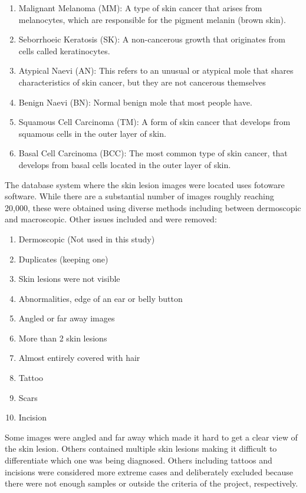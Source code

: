 \begin{enumerate}
    \item Malignant Melanoma (MM): A type of skin cancer that arises from melanocytes, which are responsible for the pigment melanin (brown skin).
    \item Seborrhoeic Keratosis (SK): A non-cancerous growth that originates from cells called keratinocytes.
    \item Atypical Naevi (AN): This refers to an unusual or atypical mole that shares characteristics of skin cancer, but they are not cancerous themselves
    \item Benign Naevi (BN): Normal benign mole that most people have.
    \item Squamous Cell Carcinoma (TM): A form of skin cancer that develops from squamous cells in the outer layer of skin.
    \item Basal Cell Carcinoma (BCC): The most common type of skin cancer, that develops from basal cells located in the outer layer of skin.
\end{enumerate}

The database system where the skin lesion images were located uses fotoware software. While there are a substantial number of images roughly reaching 20,000, these were obtained using diverse methods including between dermoscopic and macroscopic. Other issues included and were removed: 

\begin{enumerate}
    \item Dermoscopic (Not used in this study)
    \item Duplicates (keeping one)
    \item Skin lesions were not visible
    \item Abnormalities, edge of an ear or belly button
    \item Angled or far away images
    \item More than 2 skin lesions
    \item Almost entirely covered with hair
    \item Tattoo
    \item Scars
    \item Incision
\end{enumerate}

Some images were angled and far away which made it hard to get a clear view of the skin lesion. Others contained multiple skin lesions making it difficult to differentiate which one was being diagnosed. Others including tattoos and incisions were considered more extreme cases and deliberately excluded because there were not enough samples or outside the criteria of the project, respectively. 

